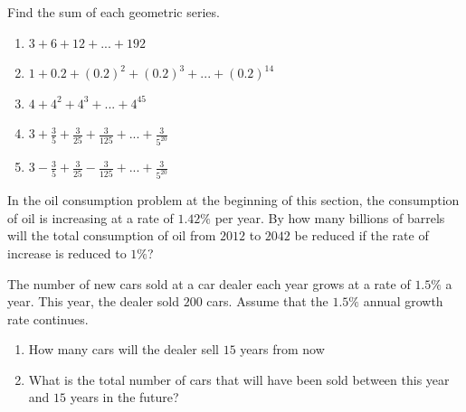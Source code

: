 \documentclass[10pt,]{book}
\theoremstyle{ptxdefinitionnotitle}
\theoremstyle{ptxdefinitiontitle}
\theoremstyle{ptxdefinitionnotitle}
\theoremstyle{ptxdefinitiontitle}
\theoremstyle{ptxdefinitionnotitle}
\theoremstyle{ptxdefinitiontitle}
\numberwithin{equation}{section}
\begin{document}
\begin{divisionexercise}{8}\hypertarget{exercise-39}{}
\hypertarget{p-180}{}%
Find the sum of each geometric series.%
\leavevmode%
\begin{enumerate}[label=(\alph*)]
\item\hypertarget{li-83}{}\(3 + 6 + 12 + ... + 192\)%
\item\hypertarget{li-84}{}\(1 + 0.2 + (0.2)^2 + (0.2)^3 + ... + (0.2)^14\)%
\item\hypertarget{li-85}{}\(4 + 4^2 + 4^3 + ... + 4^45\)%
\item\hypertarget{li-86}{}\(3 + \frac{3}{5} + \frac{3}{25} + \frac{3}{125} + ... + \frac{3}{5^{20}}\)%
\item\hypertarget{li-87}{}\(3 - \frac{3}{5} + \frac{3}{25} - \frac{3}{125} + ... + \frac{3}{5^{20}}\)%
\end{enumerate}
\end{divisionexercise}%
\begin{divisionexercise}{9}\hypertarget{exercise-40}{}
\hypertarget{p-181}{}%
In the oil consumption problem at the beginning of this section, the consumption of oil is increasing at a rate of \(1.42\%\) per year. By how many billions of barrels will the total consumption of oil from \(2012\) to \(2042\) be reduced if the rate of increase is reduced to \(1\%\)?%
\end{divisionexercise}%
\begin{divisionexercise}{10}\hypertarget{exercise-41}{}
\hypertarget{p-182}{}%
The number of new cars sold at a car dealer each year grows at a rate of \(1.5\%\) a year. This year, the dealer sold \(200\) cars. Assume that the \(1.5\%\) annual growth rate continues.%
\leavevmode%
\begin{enumerate}[label=(\alph*)]
\item\hypertarget{li-88}{}How many cars will the dealer sell \(15\) years from now%
\item\hypertarget{li-89}{}What is the total number of cars that will have been sold between this year and \(15\) years in the future?%
\end{enumerate}
\end{divisionexercise}%
\end{document}
